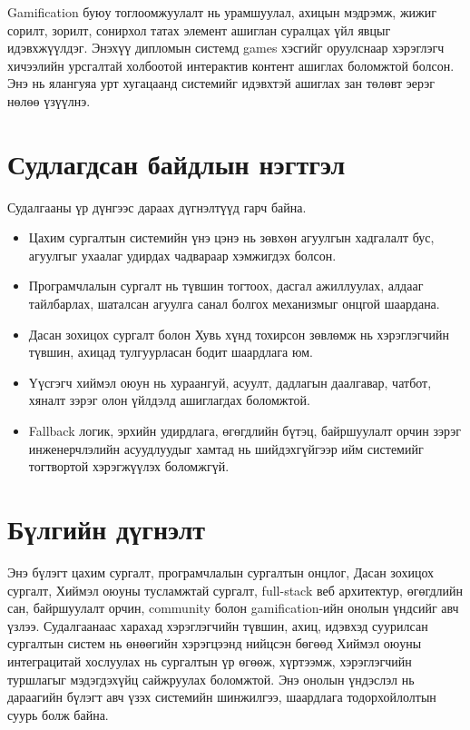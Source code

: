 Gamification буюу тоглоомжуулалт нь урамшуулал, ахицын мэдрэмж, жижиг сорилт, зорилт, сонирхол татах элемент ашиглан суралцах үйл явцыг идэвхжүүлдэг. Энэхүү дипломын системд games хэсгийг оруулснаар хэрэглэгч хичээлийн урсгалтай холбоотой интерактив контент ашиглах боломжтой болсон. Энэ нь ялангуяа урт хугацаанд системийг идэвхтэй ашиглах зан төлөвт эерэг нөлөө үзүүлнэ.

\section{Судлагдсан байдлын нэгтгэл}
Судалгааны үр дүнгээс дараах дүгнэлтүүд гарч байна.
\begin{itemize}
\item Цахим сургалтын системийн үнэ цэнэ нь зөвхөн агуулгын хадгалалт бус, агуулгыг ухаалаг удирдах чадвараар хэмжигдэх болсон.
\item Програмчлалын сургалт нь түвшин тогтоох, дасгал ажиллуулах, алдааг тайлбарлах, шаталсан агуулга санал болгох механизмыг онцгой шаардана.
\item Дасан зохицох сургалт болон Хувь хүнд тохирсон зөвлөмж нь хэрэглэгчийн түвшин, ахицад тулгуурласан бодит шаардлага юм.
\item Үүсгэгч хиймэл оюун нь хураангуй, асуулт, дадлагын даалгавар, чатбот, хяналт зэрэг олон үйлдэлд ашиглагдах боломжтой.
\item Fallback логик, эрхийн удирдлага, өгөгдлийн бүтэц, байршуулалт орчин зэрэг инженерчлэлийн асуудлуудыг хамтад нь шийдэхгүйгээр ийм системийг тогтвортой хэрэгжүүлэх боломжгүй.
\end{itemize}

\section{Бүлгийн дүгнэлт}
Энэ бүлэгт цахим сургалт, програмчлалын сургалтын онцлог, Дасан зохицох сургалт, Хиймэл оюуны тусламжтай сургалт, full-stack веб архитектур, өгөгдлийн сан, байршуулалт орчин, community болон gamification-ийн онолын үндсийг авч үзлээ. Судалгаанаас харахад хэрэглэгчийн түвшин, ахиц, идэвхэд суурилсан сургалтын систем нь өнөөгийн хэрэгцээнд нийцсэн бөгөөд Хиймэл оюуны интеграцитай хослуулах нь сургалтын үр өгөөж, хүртээмж, хэрэглэгчийн туршлагыг мэдэгдэхүйц сайжруулах боломжтой. Энэ онолын үндэслэл нь дараагийн бүлэгт авч үзэх системийн шинжилгээ, шаардлага тодорхойлолтын суурь болж байна.
